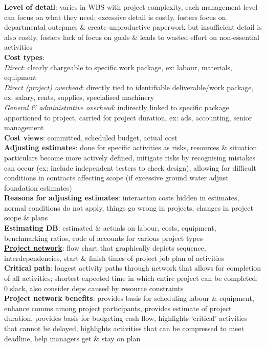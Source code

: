 \documentclass[a4paper]{article}
\begin{document}
\begin{multicols}{2}
        \textbf{Level of detail}: varies in WBS with project complexity, each management level can focus on what they need; excessive detail is costly, fosters focus on departmental outcpmes \& create unproductive paperwork but insufficient detail is also costly, fosters lack of focus on goals \& leads to wasted effort on non-essential activities\\
        \textbf{Cost types}:\\
        \textit{Direct}: clearly chargeable to specific work package, ex: labour, materials, equipment\\
        \textit{Direct (project) overhead}: directly tied to identifiable deliverable/work package, ex: salary, rents, supplies, specialised machinery\\
        \textit{General \& administrative overhead}: indirectly linked to specific package apportioned to project, carried for project duration, ex: ads, accounting, senior management\\
        \textbf{Cost views}: committed, scheduled budget, actual cost\\
        \textbf{Adjusting estimates}: done for specific activities as risks, resources \& situation particulars become more actively defined, mitigate risks by recognising mistakes can occur (ex: include independent testers to check design), allowing for difficult conditions in contracts affecting scope (if excessive ground water adjust foundation estimates)\\
        \textbf{Reasons for adjusting estimates}: interaction costs hidden in estimates, normal conditions do not apply, things go wrong in projects, changes in project scope \& plans\\
        \textbf{Estimating DB}: estimated \& actuals on labour, costs, equipment, benchmarking ratios, code of accounts for various project types\\
        \underline{\textbf{Project network}}: flow chart that graphically depicts sequence, interdependencies, start \& finish times of project job plan of activities\\
        \textbf{Critical path}: longest activity paths through network that allows for completion of all activities; shortest expected time in which entire project can be completed; 0 slack, also consider deps caused by resource constraints\\
        \textbf{Project network benefits}: provides basis for scheduling labour \& equipment, enhance comms among project participants, provides estimate of project duration, provides basis for budgeting cash flow, highlights `critical' activities that cannot be delayed, highlights activities that can be compressed to meet deadline, help managers get \& stay on plan\\

\end{multicols}
\end{document}
